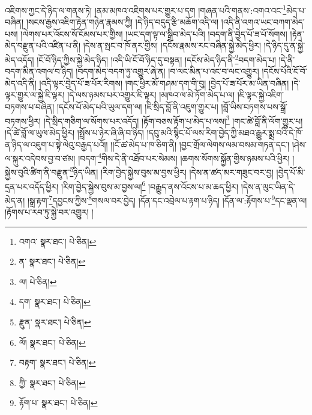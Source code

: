 འཇིགས་ཀྱང་དེ་ཉིད་ལ་གནས་ཏེ། །ནམ་མཁའ་འཇིགས་པར་གྱུར་པ་དག །གཞན་པའི་གནས་:འགའ་འང་\footnote{འགའ་  སྣར་ཐང་།  པེ་ཅིན། }མེད་པ་བཞིན། །སངས་རྒྱས་འཇིག་རྟེན་གཉེན་རྣམས་ཀྱི། །དེ་ཉིད་བདུད་རྩི་མཆོག་འདི་ལ། །འདི་ནི་འགའ་ཡང་བཀག་མེད་པས། །ལེགས་པར་འོངས་སོ་ངོམས་པར་གྱིས། །ཡང་དག་ལྟ་ལ་སྒྲིབ་མེད་པའི། །བདག་ནི་བྱེད་པོ་ཟ་པོ་སོགས། །རྟེན་མེད་བརྫུན་པའི་འཛིན་པ་ནི། །དེས་ན་སྤང་བ་ཁོ་ནར་གྱིས། །དངོས་རྣམས་རང་བཞིན་སྐྱེ་མེད་ཕྱིར། །དེ་ཉིད་དུ་ན་སྐྱེ་མེད་འདོད། །ངོ་བོ་ཉིད་ཀྱིས་སྐྱེ་མེད་ཉིད། །འདི་ཡི་ངོ་བོ་ཉིད་དུ་བསྟན། །དངོས་མེད་ཉིད་ནི་\footnote{ན་  སྣར་ཐང་།  པེ་ཅིན། }བདག་མེད་པ། །དེ་ནི་བདག་མིན་འགལ་བ་ཉིད། །བདག་མེད་བདག་ཏུ་འགྱུར་ཞེ་ན། །བ་ལང་མིན་པ་འང་བ་ལང་འགྱུར། །དངོས་པོའི་ངོ་བོ་མེད་འདི་ནི། །འདི་ལྟར་བྱེད་པོ་ཟ་པོར་རིགས། །གང་ཕྱིར་མོ་གཤམ་དག་གི་བུ། །བྱེད་པོ་ཟ་པོར་མ་ཡིན་བཞིན། །དེ་ལྟར་གྱུར་ལ་སྐྱེ་ཇི་ལྟར། །དེ་ལས་ཉམས་པར་འགྱུར་ཇི་ལྟར། །མཁའ་ལ་མེ་ཏོག་མེད་པ་ལ། །ཇི་ལྟར་སྐྱེ་འཇིག་བཏགས་པ་བཞིན། །དངོས་པོ་མེད་པའི་ཡུལ་དག་ལ། །ཇི་སྲིད་བློ་ནི་འཇུག་གྱུར་པ། །བློ་ཡིས་བཏགས་པས་སྒྲོ་བཏགས་ཕྱིར། །དེ་སྲིད་གཅིག་ལ་སོགས་པར་འདོད། །རྟོག་བཅས་རྟོག་པ་མེད་པ་ལས།\footnote{ལ།  པེ་ཅིན། } །གང་ཚེ་བློ་ནི་ལོག་གྱུར་པ། །དེ་ཚེ་བློ་ལ་ཡུལ་མེད་ཕྱིར། །སྤྲོས་པ་ཉེར་ཞི་ཞི་བ་ཉིད། །དབུ་མའི་སྙིང་པོ་ལས་རིག་བྱེད་ཀྱི་མཐའ་རྒྱུར་སྨྲ་བའི་དེ་ཁོ་ན་ཉིད་ལ་འཇུག་པ་སྟེ་ལེའུ་བརྒྱད་པའོ།། །།ངོ་ཚ་མེད་པ་ཁ་ཅིག་ནི། །བྱང་གྲོལ་ལེགས་ལམ་བསམ་གཏན་དང་། །ཤེས་ལ་སྐུར་འདེབས་བྱ་བ་ཙམ། །བདག་\footnote{དག་  སྣར་ཐང་།  པེ་ཅིན། }གིས་དེ་ནི་འཐོབ་པར་སེམས། །ཆགས་སོགས་སྐྱོན་གྱིས་ཉམས་པའི་ཕྱིར། །སྐྱེས་བུའི་ཚིག་ནི་བརྫུན་\footnote{རྫུན་  སྣར་ཐང་།  པེ་ཅིན། }ཉིད་ཡིན། །རིག་བྱེད་སྐྱེས་བུས་མ་བྱས་ཕྱིར། །དེས་ན་ཚད་མར་གཟུང་བར་བྱ། །བྱེད་པོ་མི་དྲན་པར་འདོད་ཕྱིར། །རིག་བྱེད་སྐྱེས་བུས་མ་བྱས་ལ།\footnote{ལོ།  སྣར་ཐང་།  པེ་ཅིན། } །བརྒྱུད་ནས་འོངས་པ་མ་ཆད་ཕྱིར། །དེས་ན་ལུང་ཡིན་དེ་མེད་ན། །སྒྲ་རྟག་\footnote{བརྟག་  སྣར་ཐང་།  པེ་ཅིན། }དབྱངས་ཀྱིས་\footnote{ཀྱི་  སྣར་ཐང་།  པེ་ཅིན། }གསལ་བར་བྱེད། །དོན་དང་འབྲེལ་པ་རྟག་པ་ཉིད། །དོན་ལ་:རྟོགས་པ་\footnote{རྟོག་པ་  སྣར་ཐང་།  པེ་ཅིན། }དང་ལྡན་ལ། །རྟོགས་པ་རབ་ཏུ་སྐྱེ་བར་འགྱུར། །
